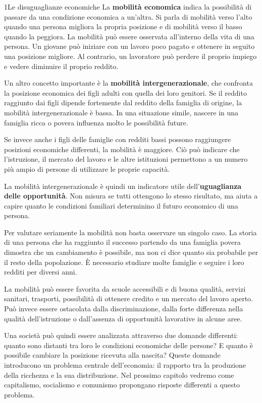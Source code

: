 \begin{lettura}{1}{Le disuguaglianze economiche}
La \textbf{mobilità economica} indica la possibilità di passare da una condizione economica a un'altra. Si parla di mobilità verso l'alto quando una persona migliora la propria posizione e di mobilità verso il basso quando la peggiora. La mobilità può essere osservata all'interno della vita di una persona. Un giovane può iniziare con un lavoro poco pagato e ottenere in seguito una posizione migliore. Al contrario, un lavoratore può perdere il proprio impiego e vedere diminuire il proprio reddito.

Un altro concetto importante è la \textbf{mobilità intergenerazionale}, che confronta la posizione economica dei figli adulti con quella dei loro genitori. Se il reddito raggiunto dai figli dipende fortemente dal reddito della famiglia di origine, la mobilità intergenerazionale è bassa. In una situazione simile, nascere in una famiglia ricca o povera influenza molto le possibilità future.

Se invece anche i figli delle famiglie con redditi bassi possono raggiungere posizioni economiche differenti, la mobilità è maggiore. Ciò può indicare che l'istruzione, il mercato del lavoro e le altre istituzioni permettono a un numero più ampio di persone di utilizzare le proprie capacità.

La mobilità intergenerazionale è quindi un indicatore utile dell'\textbf{uguaglianza delle opportunità}. Non misura se tutti ottengono lo stesso risultato, ma aiuta a capire quanto le condizioni familiari determinino il futuro economico di una persona.

Per valutare seriamente la mobilità non basta osservare un singolo caso. La storia di una persona che ha raggiunto il successo partendo da una famiglia povera dimostra che un cambiamento è possibile, ma non ci dice quanto sia probabile per il resto della popolazione. È necessario studiare molte famiglie e seguire i loro redditi per diversi anni.

La mobilità può essere favorita da scuole accessibili e di buona qualità, servizi sanitari, trasporti, possibilità di ottenere credito e un mercato del lavoro aperto. Può invece essere ostacolata dalla discriminazione, dalla forte differenza nella qualità dell'istruzione o dall'assenza di opportunità lavorative in alcune aree.

Una società può quindi essere analizzata attraverso due domande differenti: quanto sono distanti tra loro le condizioni economiche delle persone? E quanto è possibile cambiare la posizione ricevuta alla nascita? Queste domande introducono un problema centrale dell'economia: il rapporto tra la produzione della ricchezza e la sua distribuzione. Nel prossimo capitolo vedremo come capitalismo, socialismo e comunismo propongano risposte differenti a questo problema.


\end{lettura}
